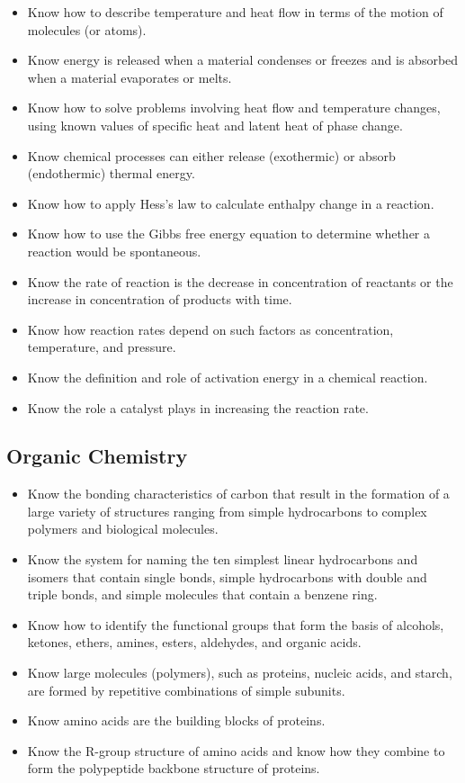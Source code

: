 \documentclass[11pt]{article}
\begin{document}
\begin{itemize}
\item Know how to describe temperature and heat flow in terms of the motion of molecules (or atoms).
\item Know energy is released when a material condenses or freezes and is absorbed when a material evaporates or melts.
\item Know how to solve problems involving heat flow and temperature changes, using known values of specific heat and latent heat of phase change.
\item Know chemical processes can either release (exothermic) or absorb (endothermic) thermal energy.
\item Know how to apply Hess's law to calculate enthalpy change in a reaction.
\item Know how to use the Gibbs free energy equation to determine whether a reaction would be spontaneous.
\item Know the rate of reaction is the decrease in concentration of reactants or the increase in concentration of products with time.
\item Know how reaction rates depend on such factors as concentration, temperature, and pressure.
\item Know the definition and role of activation energy in a chemical reaction.
\item Know the role a catalyst plays in increasing the reaction rate.
\end{itemize}
\subsection{Organic Chemistry}
\label{sec:orgb78fc75}

\begin{itemize}
\item Know the bonding characteristics of carbon that result in the formation of a large variety of structures ranging from simple hydrocarbons to complex polymers and biological molecules.
\item Know the system for naming the ten simplest linear hydrocarbons and isomers that contain single bonds, simple hydrocarbons with double and triple bonds, and simple molecules that contain a benzene ring.
\item Know how to identify the functional groups that form the basis of alcohols, ketones, ethers, amines, esters, aldehydes, and organic acids.
\item Know large molecules (polymers), such as proteins, nucleic acids, and starch, are formed by repetitive combinations of simple subunits.
\item Know amino acids are the building blocks of proteins.
\item Know the R-group structure of amino acids and know how they combine to form the polypeptide backbone structure of proteins.
\end{itemize}
\end{document}
